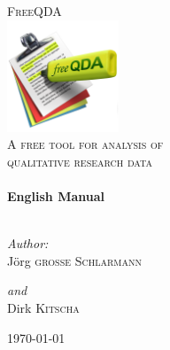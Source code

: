 \documentclass[a4paper,%
			12pt, 		%
			DIV=calc, 	%
			oneside, 	%
			headsepline, 	%
			ngerman, 	%
			smallheadings, 	%
			openany, 	%
			liststotoc, 	%
			bibtotoc]	%
			{scrbook} 	%
\begin{document}

%

	
\begin{titlepage}

\begin{center}


\textsc{\LARGE FreeQDA}\\[1.5cm]
\includegraphics[width=0.25\textwidth]{img/freeQDA_FINAL_1024}\\[1cm]    



\textsc{\Large A free tool for analysis of \\qualitative research data}\\[0.5cm]


\HRule \\[0.4cm]
{ \huge \bfseries English Manual}\\[0.4cm]

\HRule \\[1.5cm]

\begin{minipage}{0.4\textwidth}
\begin{flushleft} \large
\emph{Author:}\\
Jörg \textsc{große Schlarmann}
\end{flushleft}
\end{minipage}
\begin{minipage}{0.4\textwidth}
\begin{flushright} \large
\emph{and} \\
Dirk \textsc{Kitscha}
\end{flushright}
\end{minipage}

\vfill

{\large \today}

\end{center}

\end{titlepage}
\end{document}
